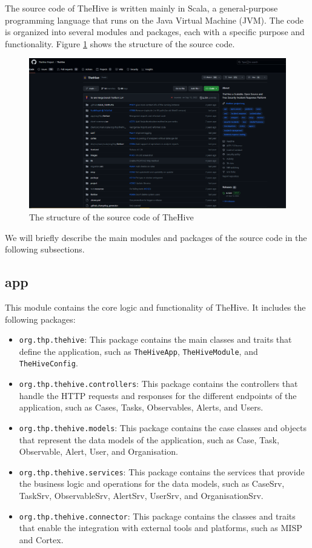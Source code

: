 

The source code of TheHive is written mainly in Scala, a general-purpose programming language that runs on the Java Virtual Machine (JVM). The code is organized into several modules and packages, each with a specific purpose and functionality. Figure \ref{fig:modules} shows the structure of the source code.

\begin{figure}[h]
    \centering
    \includegraphics[width=\textwidth]{images/source_code/thehive_src_code.PNG}
    \caption{The structure of the source code of TheHive}
    \label{fig:modules}
\end{figure}

We will briefly describe the main modules and packages of the source code in the following subsections.

\subsection{app}

This module contains the core logic and functionality of TheHive. It includes the following packages:

\begin{itemize}
    \item \texttt{org.thp.thehive}: This package contains the main classes and traits that define the application, such as \texttt{TheHiveApp}, \texttt{TheHiveModule}, and \texttt{TheHiveConfig}.
    \item \texttt{org.thp.thehive.controllers}: This package contains the controllers that handle the HTTP requests and responses for the different endpoints of the application, such as Cases, Tasks, Observables, Alerts, and Users.
    \item \texttt{org.thp.thehive.models}: This package contains the case classes and objects that represent the data models of the application, such as Case, Task, Observable, Alert, User, and Organisation.
    \item \texttt{org.thp.thehive.services}: This package contains the services that provide the business logic and operations for the data models, such as CaseSrv, TaskSrv, ObservableSrv, AlertSrv, UserSrv, and OrganisationSrv.
    \item \texttt{org.thp.thehive.connector}: This package contains the classes and traits that enable the integration with external tools and platforms, such as MISP and Cortex.
\end{itemize}

